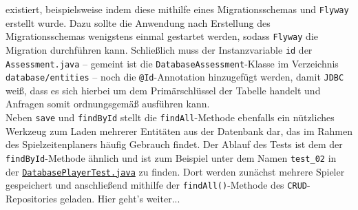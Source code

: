 existiert, beispielsweise indem diese mithilfe eines Migrationsschemas und 
\texttt{Flyway} erstellt wurde. Dazu sollte die Anwendung nach Erstellung des 
Migrationsschemas wenigstens einmal gestartet werden, sodass \texttt{Flyway} die 
Migration durchführen kann. Schließlich muss der Instanzvariable \texttt{id} der 
\texttt{Assessment.java} -- gemeint ist die \texttt{DatabaseAssessment}-Klasse im Verzeichnis \texttt{database/entities} -- noch die \texttt{@Id}-Annotation hinzugefügt 
werden, damit \texttt{JDBC} weiß, dass es sich hierbei um dem Primärschlüssel der 
Tabelle handelt und Anfragen somit ordnungsgemäß ausführen kann. \\ 
Neben \texttt{save} und \texttt{findById} stellt die \texttt{findAll}-Methode 
ebenfalls ein nützliches Werkzeug zum Laden mehrerer Entitäten aus der Datenbank dar, 
das im Rahmen des Spielzeitenplaners häufig Gebrauch findet. Der Ablauf des Tests 
ist dem der \texttt{findById}-Methode ähnlich und ist zum Beispiel unter dem Namen 
\texttt{test\_02} in der
\href{https://github.com/FlorianOhmes/bat_spielzeitenplaner/blob/main/spielzeitenplaner/src/test/java/de/bathesis/spielzeitenplaner/database/DatabasePlayerTest.java}{\texttt{DatabasePlayerTest.java}}
zu finden. Dort werden zunächst mehrere Spieler gespeichert und anschließend 
mithilfe der \texttt{findAll()}-Methode des \texttt{CRUD}-Repositories geladen. 
Hier geht's weiter... 

